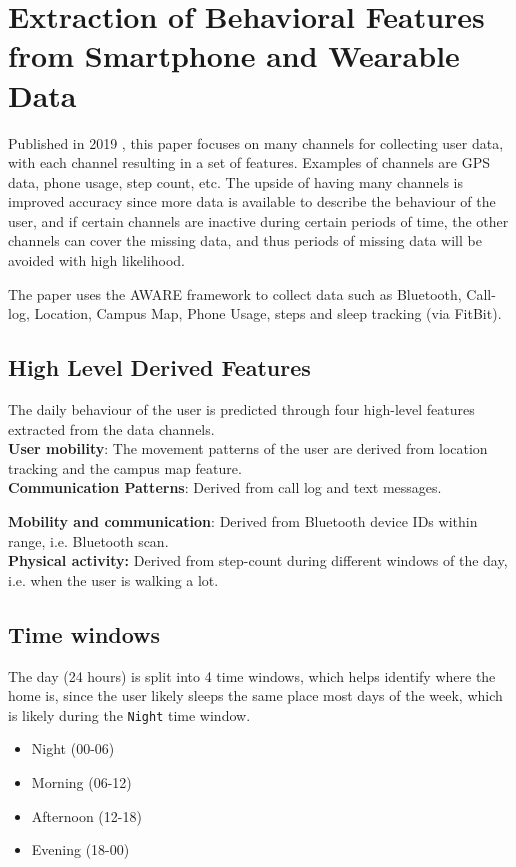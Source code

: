 \section{Extraction of Behavioral Features from Smartphone and Wearable Data}
Published in 2019 \cite{extraction-of-behavioural-features}, this paper focuses on many channels for collecting user data, with each channel resulting in a set of features. Examples of channels are GPS data, phone usage, step count, etc. The upside of having many channels is improved accuracy since more data is available to describe the behaviour of the user, and if certain channels are inactive during certain periods of time, the other channels can cover the missing data, and thus periods of missing data will be avoided with high likelihood. 

The paper uses the AWARE framework \cite{aware2015} to collect data such as  Bluetooth, Call-log, Location, Campus Map, Phone Usage, steps and sleep tracking (via FitBit).

\subsection{High Level Derived Features}
The daily behaviour of the user is predicted through four high-level features extracted from the data channels.\\

\textbf{User mobility}: The movement patterns of the user are derived from location tracking and the campus map feature.\\ 

\textbf{Communication Patterns}: Derived from call log and text messages.

\textbf{Mobility and communication}: Derived from Bluetooth device IDs within range, i.e. Bluetooth scan.\\

\textbf{Physical activity:} Derived from step-count during different windows of the day, i.e. when the user is walking a lot.\\

\subsection{Time windows}
The day (24 hours) is split into 4 time windows, which helps identify where the home is, since the user likely sleeps the same place most days of the week, which is likely during the \verb|Night| time window.

\begin{itemize}
\item Night (00-06)
\item Morning (06-12)
\item Afternoon (12-18)
\item Evening (18-00)
\end{itemize}

